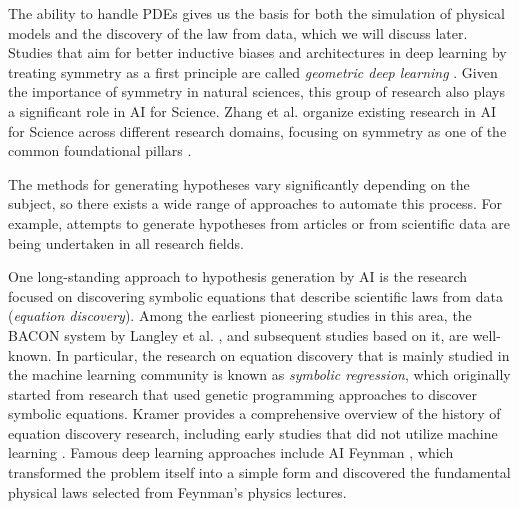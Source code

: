 The ability to handle PDEs gives us the basis for both the simulation of physical models and the discovery of the law from data, which we will discuss later. Studies that aim for better inductive biases and architectures in deep learning by treating symmetry as a first principle are called \textit{geometric deep learning} \cite{bronstein2021geometric}. Given the importance of symmetry in natural sciences, this group of research also plays a significant role in AI for Science. Zhang et al.  organize existing research in AI for Science across different research domains, focusing on symmetry as one of the common foundational pillars \cite{zhang2023artificial}.

The methods for generating hypotheses vary significantly depending on the subject, so there exists a wide range of approaches to automate this process. For example, attempts to generate hypotheses from articles or from scientific data are being undertaken in all research fields. 

One long-standing approach to hypothesis generation by AI is the research focused on discovering symbolic equations that describe scientific laws from data (\textit{equation discovery}). Among the earliest pioneering studies in this area, the BACON system by Langley et al. \cite{langley1987scientific}, and subsequent studies based on it, are well-known. In particular, the research on equation discovery that is mainly studied in the machine learning community is known as \textit{symbolic regression}, which originally started from research that used genetic programming approaches to discover symbolic equations.
 Kramer provides a comprehensive overview of the history of equation discovery research, including early studies that did not utilize machine learning \cite{kramer2023automated}. Famous deep learning approaches include AI Feynman \cite{udrescu2020ai,udrescu2020ai2}, which transformed the problem itself into a simple form and discovered the fundamental physical laws selected from Feynman's physics lectures.

